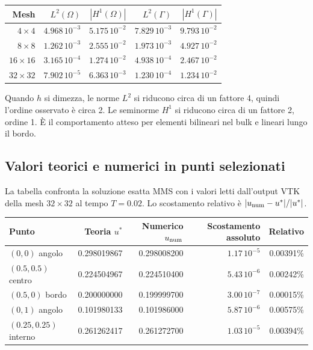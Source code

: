 \documentclass[11pt,a4paper]{article}
\begin{document}
\begin{center}
\small
\begin{tabular}{rrrrr}
\toprule
Mesh & $L^2(\Omega)$ & $|H^1(\Omega)|$ & $L^2(\Gamma)$ & $|H^1(\Gamma)|$\\
\midrule
$4\times4$   & $4.968\,10^{-3}$ & $5.175\,10^{-2}$ & $7.829\,10^{-3}$ & $9.793\,10^{-2}$\\
$8\times8$   & $1.262\,10^{-3}$ & $2.555\,10^{-2}$ & $1.973\,10^{-3}$ & $4.927\,10^{-2}$\\
$16\times16$ & $3.165\,10^{-4}$ & $1.274\,10^{-2}$ & $4.938\,10^{-4}$ & $2.467\,10^{-2}$\\
$32\times32$ & $7.902\,10^{-5}$ & $6.363\,10^{-3}$ & $1.230\,10^{-4}$ & $1.234\,10^{-2}$\\
\bottomrule
\end{tabular}
\end{center}

Quando $h$ si dimezza, le norme $L^2$ si riducono circa di un fattore 4, quindi l'ordine osservato è circa 2. Le seminorme $H^1$ si riducono circa di un fattore 2, ordine 1. È il comportamento atteso per elementi bilineari nel bulk e lineari lungo il bordo.

\subsection*{Valori teorici e numerici in punti selezionati}
La tabella confronta la soluzione esatta MMS con i valori letti dall'output VTK della mesh $32\times32$ al tempo $T=0.02$. Lo scostamento relativo è $|u_{\rm num}-u^*|/|u^*|$.
\begin{center}
\small
\begin{tabular}{lrrrr}
\toprule
Punto & Teoria $u^*$ & Numerico $u_{\rm num}$ & Scostamento assoluto & Relativo\\
\midrule
$(0,0)$ angolo & 0.298019867 & 0.298008200 & $1.17\,10^{-5}$ & 0.00391\%\\
$(0.5,0.5)$ centro & 0.224504967 & 0.224510400 & $5.43\,10^{-6}$ & 0.00242\%\\
$(0.5,0)$ bordo & 0.200000000 & 0.199999700 & $3.00\,10^{-7}$ & 0.00015\%\\
$(0,1)$ angolo & 0.101980133 & 0.101986000 & $5.87\,10^{-6}$ & 0.00575\%\\
$(0.25,0.25)$ interno & 0.261262417 & 0.261272700 & $1.03\,10^{-5}$ & 0.00394\%\\
\bottomrule
\end{tabular}
\end{center}
\end{document}
